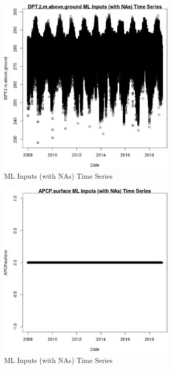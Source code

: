 \begin{figure} 
\centering  
\includegraphics[width=0.77\textwidth]{Code_Outputs/Report_ML_input_PM25_Step4_part_f_de_duplicated_aves_prioritize_24hr_obswNAs_DPT2mabovegroundvDate.jpg} 
\caption{\label{fig:Report_ML_input_PM25_Step4_part_f_de_duplicated_aves_prioritize_24hr_obswNAsDPT2mabovegroundvDate}ML Inputs (with NAs) Time Series} 
\end{figure} 
 

\clearpage 

\begin{figure} 
\centering  
\includegraphics[width=0.77\textwidth]{Code_Outputs/Report_ML_input_PM25_Step4_part_f_de_duplicated_aves_prioritize_24hr_obswNAs_APCPsurfacevDate.jpg} 
\caption{\label{fig:Report_ML_input_PM25_Step4_part_f_de_duplicated_aves_prioritize_24hr_obswNAsAPCPsurfacevDate}ML Inputs (with NAs) Time Series} 
\end{figure} 
 

